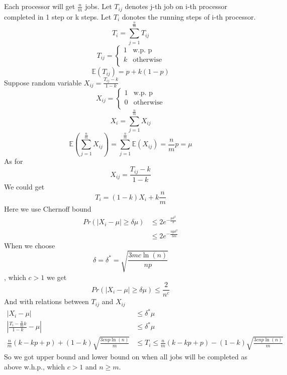 \documentclass{article}
\begin{document}
	\section{}
	Each processor will get $\frac{n}{m}$ jobs. Let $T_{ij}$ denotes j-th job on i-th processor completed in 1 step or k steps. Let $T_{i}$ donotes the running steps of i-th processor.
	$$T_{i}=\sum_{j=1}^{\frac{n}{m}}T_{ij}$$
	$$
	T_{ij} = 
	\begin{cases} 
	1& \text{w.p. p} \\
	k& \text{otherwise}\\
	\end{cases}
	$$
	$$\mathbb{E}(T_{ij})=p+k(1-p)$$
	Suppose random variable $X_{ij} = \frac{T_{ij}-k}{1-k}$
	$$
	X_{ij}=
	\begin{cases}
	1& \text{w.p. p} \\
	0& \text{otherwise}\\
	\end{cases}
	$$
	$$X_{i}=\sum_{j=1}^{\frac{n}{m}}X_{ij}$$
	$$\mathbb{E}(\sum_{j=1}^{\frac{n}{m}}X_{ij})=\sum_{j=1}^{\frac{n}{m}}\mathbb{E}(X_{ij})=\frac{n}{m}p=\mu$$
	As for$$X_{ij}=\frac{T_{ij}-k}{1-k}$$
	We could get
	$$T_{i}=(1-k)X_{i}+k\frac{n}{m}$$
	Here we use Chernoff bound
	$$
	\begin{aligned}
	Pr(\left| X_{i}-\mu\right|\geq \delta\mu) &\leq 2e^{-\frac{\mu\delta^2}{3}}\\
	&\leq 2e^{-\frac{np\delta^2}{3m}}
	\end{aligned}
	$$
	When we choose 
	$$\delta = \delta^{*} = \sqrt{\frac{3mc\ln{(n)}}{np}}$$, which $c>1$
	we get
	$$
	Pr(\left| X_{i}-\mu\right|\geq \delta\mu) \leq \frac{2}{n^c}
	$$
	And with relations between $T_{ij}$ and $X_{ij}$
	$$
	\begin{aligned}
	\left| X_{i}-\mu\right| &\leq \delta^{*}\mu\\
	\left| \frac{T_{i}-\frac{n}{m}k}{1-k} - \mu\right| &\leq \delta^{*}\mu \\
	\frac{n}{m}(k-kp+p)+(1-k)\sqrt{\frac{3cnp\ln(n)}{m}} &\leq T_{i} \leq \frac{n}{m}(k-kp+p)-(1-k)\sqrt{\frac{3cnp\ln(n)}{m}}
	\end{aligned}
	$$
	So we got upper bound and lower bound on when all jobs will be completed as above w.h.p., which $c>1$ and $n\geq m$.
\end{document}
